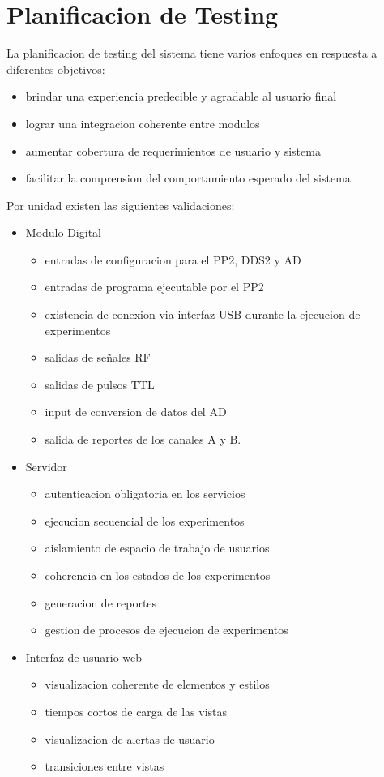 \section{Planificacion de Testing}

La planificacion de testing del sistema tiene varios enfoques en respuesta a diferentes objetivos:
\begin{itemize}
    \item brindar una experiencia predecible y agradable al usuario final
    \item lograr una integracion coherente entre modulos
    \item aumentar cobertura de requerimientos de usuario y sistema
    \item facilitar la comprension del comportamiento esperado del sistema
\end{itemize}
Por unidad existen las siguientes validaciones:
\begin{itemize}
    \item Modulo Digital
    \begin{itemize}
        \item entradas de configuracion para el PP2, DDS2 y AD
        \item entradas de programa ejecutable por el PP2
        \item existencia de conexion via interfaz USB durante la ejecucion de experimentos
        \item salidas de señales RF
        \item salidas de pulsos TTL
        \item input de conversion de datos del AD
        \item salida de reportes de los canales A y B.
    \end{itemize}
    \item Servidor
    \begin{itemize}
        \item autenticacion obligatoria en los servicios
        \item ejecucion secuencial de los experimentos
        \item aislamiento de espacio de trabajo de usuarios
        \item coherencia en los estados de los experimentos
        \item generacion de reportes
        \item gestion de procesos de ejecucion de experimentos
    \end{itemize}
    \item Interfaz de usuario web
    \begin{itemize}
        \item visualizacion coherente de elementos y estilos
        \item tiempos cortos de carga de las vistas
        \item visualizacion de alertas de usuario
        \item transiciones entre vistas
    \end{itemize}
\end{itemize}
